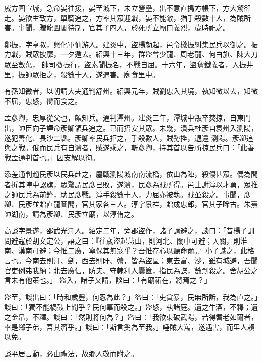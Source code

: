 \begin{pinyinscope}
 戚方圍宣城，急命晏往援，晏至城下，未立營壘，出不意直搗方帳下，方大驚卻走。晏欲生致方，單騎追之，方率其眾迎戰，晏不能敵，猶手殺數十人，為賊所害。事聞，贈龍圖閣待制，官其子四人，於死所立廟曰義烈，歲時祀之。



 鄭振，字亨叔，興化軍仙游人。建炎中，盜楊勍起，邑令檄振糾集民兵以御之。振力戰，賊眾披靡，一夕遁去。紹興十三年，群盜曾少龍、周老龍、何白旗、陳大刀眾至數萬，
 帥司檄振行，盜素聞振名，不戰自屈。十六年，盜詹鐵義者，入振井里，振帥眾拒之，殺數十人，遂遇害。廟食里中。



 有孫知微者，以朝請大夫通判舒州。紹興元年，賊劉忠入其境，執知微以去，知微不屈，忠怒，臠而食之。



 孟彥卿，忠厚從父也，頗知兵。通判潭州。建炎三年，潭城中叛卒焚掠，自東門出，帥臣向子諲命彥卿領兵追之。已而招安其眾。未幾，潰兵杜彥自袁州入瀏陽，遂犯善化、長沙二縣。彥卿率民兵拒之，手殺數人，賊勢挫，退還
 瀏陽。彥卿追與之戰。俄而民兵有自潰者，賊遂乘之，斬彥卿，持其首以告所掠民兵曰：「此善戰孟通判首也。」因支解以徇。



 添差通判趙民彥以民兵赴之，鏖戰瀏陽城南南流橋，依山為陣，殺傷甚眾。偶為間者折其陣中認旗，眾驚謂民彥已敗，遂潰，民彥為賊所得。邑士謝淳以才勇，眾推之帥民兵為前鋒，助民彥戰。淳手殺數十人，力屈亦被執。賊並殺之。事聞，彥卿、民彥並贈直龍圖閣，官其家各三人。淳字景祥，贈成忠郎，官其子晞古。朱熹
 帥湖南，請為彥卿、民彥立廟，以淳侑之。



 高談字景遂，邵武光澤人。紹定二年，旁郡盜作，諸子請避之，談曰：「昔楊子訓問避寇於胡文定公，語之曰：『往歲盜起燕山，則河北、關中可避；入關，則淮南、漢南可避；今惟二廣，寧保其無寇乎？吾惟存心以聽命爾。』小子識之，此格言也。今南去則汀、劍，西去則盱、贛，皆為盜區；東去富、沙，雖有城避，吾聞官吏例弗我納；北去廣信，防夫、守隸利人囊篋，指民為諜，數剽殺之。舍胡公之言未有他策也。」
 盜入，諸子又請，談曰：「有廟祏在，將焉之？」



 盜至，談出曰：「時和歲豐，何忍為此？」盜曰：「吏貪暴，民無所訴，我為直之。」談曰：「獨不能楇鼓上聞乎？民何辜而殺之。」盜怒，執諸庭。遺之牛酒，不釋；遺之金帛，不釋。談曰：「然則將何為？」盜曰：「我欲東破武陽，若得耆老如爾者，率是鄉子弟，吾其濟乎。」談曰：「斯言奚為至我。」唾賊大罵，遂遇害，而里人賴以免。



 談平居言動，必由禮法，故鄉人敬而附之。




\end{pinyinscope}
